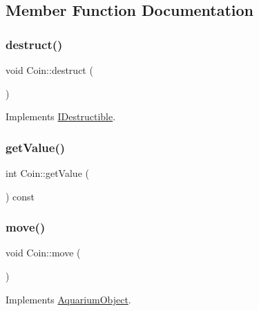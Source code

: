 \subsection{Member Function Documentation}
\mbox{\label{class_coin_a16c42ef0d21f50bb08d4099d82b4ed57}} 
\subsubsection{\texorpdfstring{destruct()}{destruct()}}
{\footnotesize\ttfamily void Coin\+::destruct (\begin{DoxyParamCaption}{ }\end{DoxyParamCaption})\hspace{0.3cm}{\ttfamily [virtual]}}



Implements \mbox{\hyperlink{class_i_destructible_a63016d1bb4daa0a726fc8add9a0be62d}{I\+Destructible}}.

\mbox{\label{class_coin_a53c8bf65afdde1422cfda51d753d74b7}} 
\subsubsection{\texorpdfstring{get\+Value()}{getValue()}}
{\footnotesize\ttfamily int Coin\+::get\+Value (\begin{DoxyParamCaption}{ }\end{DoxyParamCaption}) const}

\mbox{\label{class_coin_ab62bca5834489b9b483deaa3ca3470e9}} 
\subsubsection{\texorpdfstring{move()}{move()}}
{\footnotesize\ttfamily void Coin\+::move (\begin{DoxyParamCaption}{ }\end{DoxyParamCaption})\hspace{0.3cm}{\ttfamily [virtual]}}



Implements \mbox{\hyperlink{class_aquarium_object_a42c4de640f89ac8aebc26b7618578575}{Aquarium\+Object}}.

